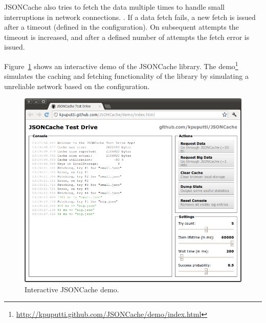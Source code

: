 JSONCache also tries to fetch the data multiple times to handle small
interruptions in network connections. . If a data fetch fails, a new fetch is
issued after a timeout (defined in the configuration). On subsequent
attempts the timeout is increased, and after a defined number of
attempts the fetch error is issued.

Figure~\ref{figure:jsoncache-demo.png} shows an interactive demo of
the JSONCache library. The
demo\footnote{\url{http://kpuputti.github.com/JSONCache/demo/index.html}}
simulates the caching and fetching functionality of the library by
simulating a unreliable network based on the configuration.

\begin{figure}[ht]
  \begin{center}
    \includegraphics[width=\textwidth]{images/jsoncache-demo.png}
    \caption{Interactive JSONCache demo.}
    \label{figure:jsoncache-demo.png}
  \end{center}
\end{figure}
